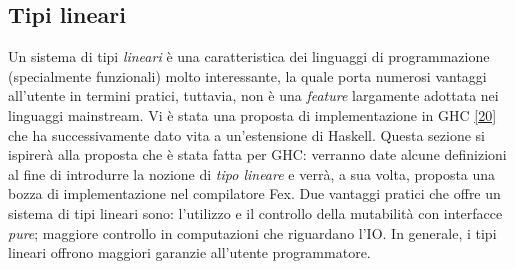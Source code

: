 \documentclass[10pt,a4paper]{article}
\begin{document}
\hypertarget{Tipi lineari}{\subsection{Tipi lineari}}
Un sistema di tipi \textit{lineari} è una caratteristica dei linguaggi di programmazione (specialmente funzionali) molto
interessante, la quale porta numerosi vantaggi all'utente in termini pratici, tuttavia, non è una \textit{feature}
largamente adottata nei linguaggi mainstream. Vi è stata una proposta di implementazione in GHC \hyperlink{bibl20}{[20]} che
ha successivamente dato vita a un'estensione di Haskell. Questa sezione si ispirerà alla proposta che è stata fatta per GHC:
verranno date alcune definizioni al fine di introdurre la nozione di \textit{tipo lineare} e verrà, a sua volta, proposta una
bozza di implementazione nel compilatore Fex. Due vantaggi pratici che offre un sistema di tipi lineari sono: l'utilizzo
e il controllo della mutabilità con interfacce \textit{pure}; maggiore controllo in computazioni che riguardano l'IO.
In generale, i tipi lineari offrono maggiori garanzie all'utente programmatore.
\end{document}
